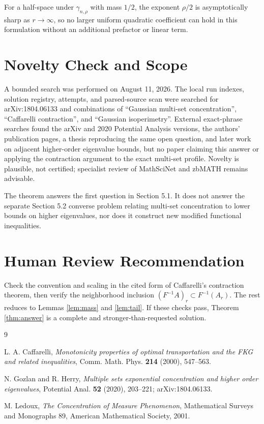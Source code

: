 \documentclass[11pt]{amsart}
\newcommand{\gammaRho}{\gamma_{n,\rho}}
\begin{document}
For a half-space under $\gammaRho$ with mass $1/2$, the exponent
$\rho/2$ is asymptotically sharp as $r\to\infty$, so no larger uniform
quadratic coefficient can hold in this formulation without an additional
prefactor or linear term.

\section*{Novelty Check and Scope}

A bounded search was performed on August 11, 2026.  The local run indexes,
solution registry, attempts, and parsed-source scan were searched for
arXiv:1804.06133 and combinations of ``Gaussian multi-set concentration'',
``Caffarelli contraction'', and ``Gaussian isoperimetry''.  External
exact-phrase searches found the arXiv and 2020 Potential Analysis versions,
the authors' publication pages, a thesis reproducing the same open question,
and later work on adjacent higher-order eigenvalue bounds, but no paper
claiming this answer or applying the contraction argument to the exact
multi-set profile.  Novelty is plausible, not certified; specialist review
of MathSciNet and zbMATH remains advisable.

The theorem answers the first question in Section 5.1.  It does not answer
the separate Section 5.2 converse problem relating multi-set concentration
to lower bounds on higher eigenvalues, nor does it construct new modified
functional inequalities.

\section*{Human Review Recommendation}

Check the convention and scaling in the cited form of Caffarelli's
contraction theorem, then verify the neighborhood inclusion
$(F^{-1}A)_r\subset F^{-1}(A_r)$.  The rest reduces to Lemmas
\ref{lem:mass} and \ref{lem:tail}.  If these checks pass, Theorem
\ref{thm:answer} is a complete and stronger-than-requested solution.

\begin{thebibliography}{9}

L. A. Caffarelli,
\emph{Monotonicity properties of optimal transportation and the FKG and
related inequalities},
Comm. Math. Phys. \textbf{214} (2000), 547--563.

N. Gozlan and R. Herry,
\emph{Multiple sets exponential concentration and higher order eigenvalues},
Potential Anal. \textbf{52} (2020), 203--221;
arXiv:1804.06133.

M. Ledoux,
\emph{The Concentration of Measure Phenomenon},
Mathematical Surveys and Monographs 89, American Mathematical Society, 2001.

\end{thebibliography}
\end{document}
